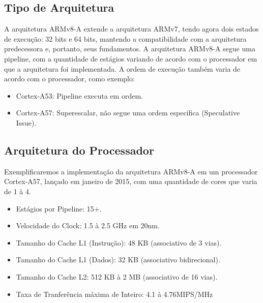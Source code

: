 \documentclass[12pt,a4paper,utf8]{ppgsi}
\begin{document}
    \subsection{Tipo de Arquitetura}
        A arquitetura ARMv8-A extende a arquitetura ARMv7, tendo agora dois estados de execução: 32 bits e 64 bits, mantendo a compatibilidade com a arquitetura predecessora e, portanto, seus fundamentos.
        A arquitetura ARMv8-A segue uma pipeline, com a quantidade de estágios variando de acordo com o processador em que a arquitetura foi implementada. A ordem de execução também varia de acordo com o processador, como exemplo:
        \begin{itemize}
            \item Cortex-A53: Pipeline executa em ordem.
        \end{itemize}
        \begin{itemize}
            \item Cortex-A57: Superescalar, não segue uma ordem específica (Speculative Issue).
        \end{itemize}

    \subsection{Arquitetura do Processador}
        Exemplificaremos a implementação da arquitetura ARMv8-A em um processador Cortex-A57, lançado em janeiro de 2015, com uma quantidade de cores que varia de 1 à 4.
        \begin{itemize}
            \item Estágios por Pipeline: 15+.
        \end{itemize}
        \begin{itemize}
            \item Velocidade do Clock: 1.5 à 2.5 GHz em 20nm.
        \end{itemize}
        \begin{itemize}
            \item Tamanho do Cache L1 (Instrução): 48 KB (associativo de 3 vias).
        \end{itemize}
        \begin{itemize}
            \item Tamanho do Cache L1 (Dados): 32 KB (associativo bidirecional).
        \end{itemize}
        \begin{itemize}
            \item Tamanho do Cache L2: 512 KB à 2 MB (associativo de 16 vias).
        \end{itemize}
        \begin{itemize}
            \item Taxa de Tranferência máxima de Inteiro: 4.1 à 4.76MIPS/MHz
        \end{itemize}        
    


\nocite{manual}
\nocite{pressreal}
\nocite{pressarmv86}
\nocite{pressSdragon}
\nocite{bench}
\nocite{atomclose}
\end{document}
